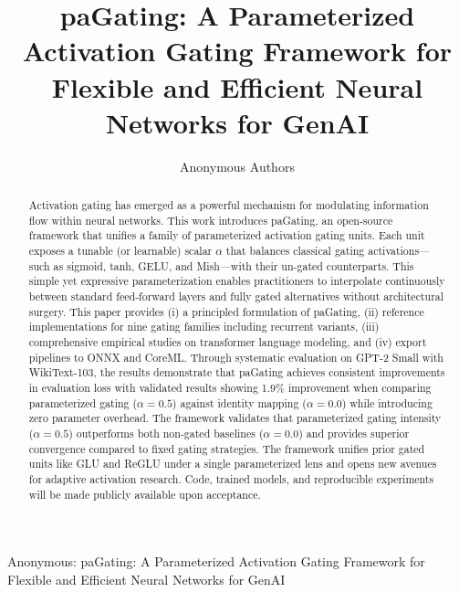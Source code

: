 \documentclass[lettersize,journal]{IEEEtran}
\begin{document}
\title{paGating: A Parameterized Activation Gating Framework for Flexible and Efficient Neural Networks for GenAI}

\author{Anonymous Authors}

%
{Anonymous: paGating: A Parameterized Activation Gating Framework for Flexible and Efficient Neural Networks for GenAI}

\maketitle

\begin{abstract}
Activation gating has emerged as a powerful mechanism for modulating information flow within neural networks. This work introduces paGating, an open-source framework that unifies a family of parameterized activation gating units. Each unit exposes a tunable (or learnable) scalar $\alpha$ that balances classical gating activations—such as sigmoid, tanh, GELU, and Mish—with their un-gated counterparts. This simple yet expressive parameterization enables practitioners to interpolate continuously between standard feed-forward layers and fully gated alternatives without architectural surgery. This paper provides (i) a principled formulation of paGating, (ii) reference implementations for nine gating families including recurrent variants, (iii) comprehensive empirical studies on transformer language modeling, and (iv) export pipelines to ONNX and CoreML. Through systematic evaluation on GPT-2 Small with WikiText-103, the results demonstrate that paGating achieves consistent improvements in evaluation loss with validated results showing 1.9\% improvement when comparing parameterized gating ($\alpha=0.5$) against identity mapping ($\alpha=0.0$) while introducing zero parameter overhead. The framework validates that parameterized gating intensity ($\alpha = 0.5$) outperforms both non-gated baselines ($\alpha = 0.0$) and provides superior convergence compared to fixed gating strategies. The framework unifies prior gated units like GLU and ReGLU under a single parameterized lens and opens new avenues for adaptive activation research. Code, trained models, and reproducible experiments will be made publicly available upon acceptance.
\end{abstract}
\end{document}
